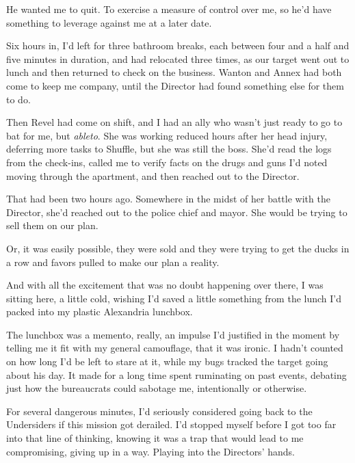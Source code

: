 He wanted me to quit.  To exercise a measure of control over me, so he'd have something to leverage against me at a later date.



Six hours in, I'd left for three bathroom breaks, each between four and a half and five minutes in duration, and had relocated three times, as our target went out to lunch and then returned to check on the business.  Wanton and Annex had both come to keep me company, until the Director had found something else for them to do.



Then Revel had come on shift, and I had an ally who wasn't just ready to go to bat for me, but \emph{able}\emph{to}.  She was working reduced hours after her head injury, deferring more tasks to Shuffle, but she was still the boss.  She'd read the logs from the check-ins, called me to verify facts on the drugs and guns I'd noted moving through the apartment, and then reached out to the Director.



That had been two hours ago.  Somewhere in the midst of her battle with the Director, she'd reached out to the police chief and mayor.  She would be trying to sell them on our plan.



Or, it was easily possible, they were sold and they were trying to get the ducks in a row and favors pulled to make our plan a reality.



And with all the excitement that was no doubt happening over there, I was sitting here, a little cold, wishing I'd saved a little something from the lunch I'd packed into my plastic Alexandria lunchbox.



The lunchbox was a memento, really, an impulse I'd justified in the moment by telling me it fit with my general camouflage, that it was ironic.  I hadn't counted on how long I'd be left to stare at it, while my bugs tracked the target going about his day.  It made for a long time spent ruminating on past events, debating just how the bureaucrats could sabotage me, intentionally or otherwise.



For several dangerous minutes, I'd seriously considered going back to the Undersiders if this mission got derailed.  I'd stopped myself before I got too far into that line of thinking, knowing it was a trap that would lead to me compromising, giving up in a way.  Playing into the Directors' hands.



